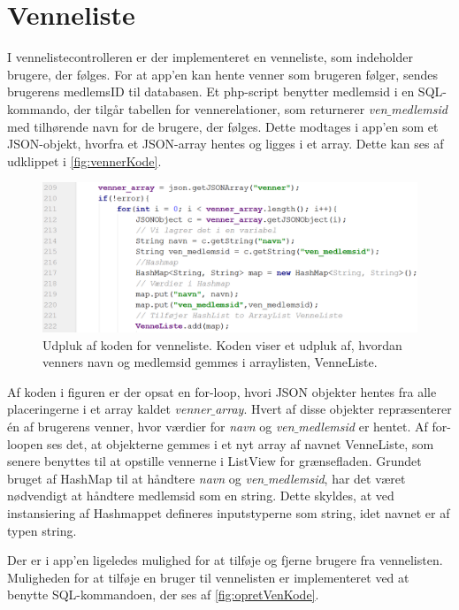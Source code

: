 \section{Venneliste}
I vennelistecontrolleren er der implementeret en venneliste, som indeholder brugere, der følges. For at app'en kan hente venner som brugeren følger, sendes brugerens medlemsID til databasen. Et php-script benytter medlemsid i en SQL-kommando, der tilgår tabellen for vennerelationer, som returnerer \textit{ven$\_$medlemsid} med tilhørende navn for de brugere, der følges. 
Dette modtages i app'en som et JSON-objekt, hvorfra et JSON-array hentes og ligges i et array. Dette kan ses af udklippet i \autoref{fig:vennerKode}.  

\begin{figure} [H]
\centering
\includegraphics[width=1\textwidth]{figures/imple/vennerKode}
\caption{Udpluk af koden for venneliste. Koden viser et udpluk af, hvordan venners navn og medlemsid gemmes i arraylisten, VenneListe.}
\label{fig:vennerKode}
\end{figure}

\noindent
Af koden i figuren er der opsat en for-loop, hvori JSON objekter hentes fra alle placeringerne i et array kaldet \textit{venner$\_$array}. Hvert af disse objekter repræsenterer én af brugerens venner, hvor værdier for \textit{navn} og \textit{ven$\_$medlemsid} er hentet. 
Af for-loopen ses det, at objekterne gemmes i et nyt array af navnet VenneListe, som senere benyttes til at opstille vennerne i ListView for grænsefladen. Grundet bruget af HashMap til at håndtere \textit{navn} og \textit{ven$\_$medlemsid}, har det været nødvendigt at håndtere medlemsid som en string. Dette skyldes, at ved instansiering af Hashmappet defineres inputstyperne som string, idet navnet er af typen string. 

Der er i app'en ligeledes mulighed for at tilføje og fjerne brugere fra vennelisten. Muligheden for at tilføje en bruger til vennelisten er implementeret ved at benytte SQL-kommandoen, der ses af \autoref{fig:opretVenKode}.

